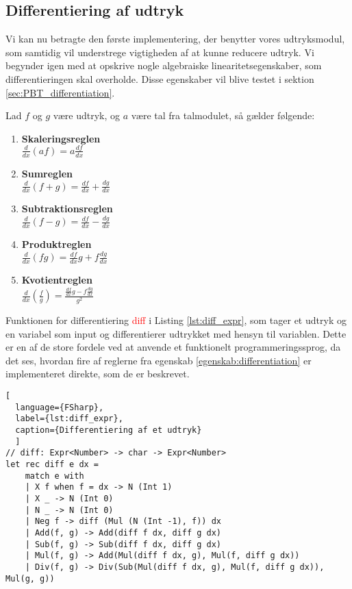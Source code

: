 \subsection{Differentiering af udtryk}
Vi kan nu betragte den første implementering, der benytter vores udtryksmodul, som samtidig vil understrege vigtigheden af at kunne reducere udtryk. Vi begynder igen med at opskrive nogle algebraiske linearitetsegenskaber, som differentieringen skal overholde. Disse egenskaber vil blive testet i sektion \ref{sec:PBT_differentiation}.
\vspace{0.5cm}
\begin{egenskab}\label{egenskab:differentiation}
  Lad $f$ og $g$ være udtryk, og $a$ være tal fra talmodulet, så gælder følgende:
  \begin{enumerate}
    \item \textbf{Skaleringsreglen} \\
    \(\frac{d}{dx}(af) = a\frac{df}{dx}\)
    \item \textbf{Sumreglen} \\
    \(\frac{d}{dx}(f+g) = \frac{df}{dx} + \frac{dg}{dx}\)
    \item \textbf{Subtraktionsreglen} \\
    \(\frac{d}{dx}(f-g) = \frac{df}{dx} - \frac{dg}{dx}\)
    \item \textbf{Produktreglen} \\
    \(\frac{d}{dx}(fg) = \frac{df}{dx}g + f\frac{dg}{dx}\)
    \item \textbf{Kvotientreglen} \\
    \(\frac{d}{dx}\left(\frac{f}{g}\right) = \frac{\frac{df}{dx}g - f\frac{dg}{dx}}{g^2}\)
  \end{enumerate}
\end{egenskab}

Funktionen for differentiering \textcolor{red}{diff} i Listing \ref{lst:diff_expr}, som tager et udtryk og en variabel som input og differentierer udtrykket med hensyn til variablen. Dette er en af de store fordele ved at anvende et funktionelt programmeringssprog, da det ses, hvordan fire af reglerne fra egenskab \ref{egenskab:differentiation} er implementeret direkte, som de er beskrevet.

\begin{lstlisting}[
  language={FSharp}, 
  label={lst:diff_expr}, 
  caption={Differentiering af et udtryk}
  ]
// diff: Expr<Number> -> char -> Expr<Number>
let rec diff e dx = 
    match e with
    | X f when f = dx -> N (Int 1)
    | X _ -> N (Int 0)
    | N _ -> N (Int 0)
    | Neg f -> diff (Mul (N (Int -1), f)) dx
    | Add(f, g) -> Add(diff f dx, diff g dx)
    | Sub(f, g) -> Sub(diff f dx, diff g dx)
    | Mul(f, g) -> Add(Mul(diff f dx, g), Mul(f, diff g dx))
    | Div(f, g) -> Div(Sub(Mul(diff f dx, g), Mul(f, diff g dx)), Mul(g, g))
\end{lstlisting}


